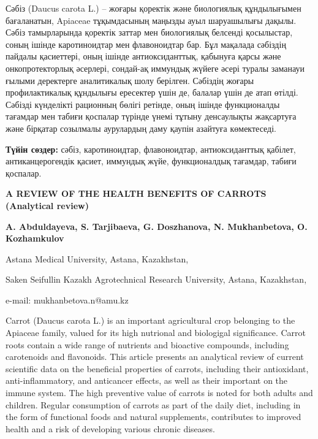 Сәбіз (Daucus carota L.) -- жоғары қоректік және биологиялық
құндылығымен бағаланатын, Apia\-ceae тұқымдасының маңызды ауыл шаруашылығы
дақылы. Сәбіз тамырларында қоректік заттар мен биологиялық белсенді
қосылыстар, соның ішінде каротиноидтар мен флавоноидтар бар. Бұл
мақалада сәбіздің пайдалы қасиеттері, оның ішінде антиоксиданттық,
қабынуға қарсы және онкопротекторлық әсерлері, сондай-ақ иммундық жүйеге
әсері туралы заманауи ғылыми деректерге аналитикалық шолу берілген.
Сәбіздің жоғары профилактикалық құндылығы ересектер үшін де, балалар
үшін де атап өтілді. Сәбізді күнделікті рационның бөлігі ретінде, оның
ішінде функционалды тағамдар мен табиғи қоспалар түрінде үнемі тұтыну
денсаулықты жақсартуға және бірқатар созылмалы аурулардың даму қаупін
азайтуға көмектеседі.

{\bfseries Түйін сөздер:} сәбіз, каротиноидтар, флавоноидтар,
антиоксиданттық қабілет, антиканцерогендік қасиет, иммундық жүйе,
функционалдық тағамдар, табиғи қоспалар.

\begin{header}
{\bfseries A REVIEW OF THE HEALTH BENEFITS OF CARROTS (Analytical review)}

{\bfseries
{}A. Abduldayeva,
S. Tarjibaeva,
G. Doszhanova,
N. Mukhanbetova\envelope ,
O. Kozhamkulov
}
\end{header}

\begin{affil}
Astana Medical University, Astana, Kazakhstan,

Saken Seifullin Kazakh Agrotechnical Research University, Astana, Kazakhstan,

e-mail: mukhanbetova.n@amu.kz
\end{affil}

Carrot (Daucus carota L.) is an important agricultural crop belonging to
the Apiaceae family, valued for its high nutrional and biologigal
significance. Carrot roots contain a wide range of nutrients and
bioactive compounds, including carotenoids and flavonoids. This article
presents an analytical review of current scientific data on the
beneficial properties of carrots, including their antioxidant,
anti-inflammatory, and anticancer effects, as well as their important on
the immune system. The high preventive value of carrots is noted for
both adults and children. Regular consumption of carrots as part of the
daily diet, including in the form of functional foods and natural
supplements, contributes to improved health and a risk of developing
various chronic diseases.

